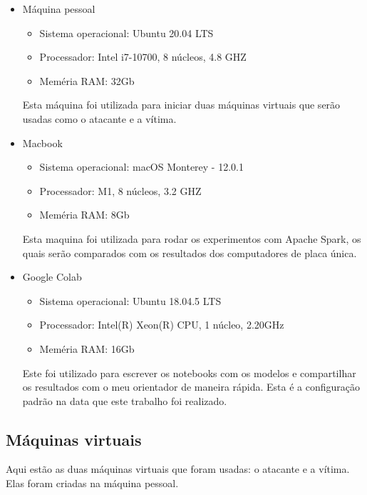\begin{itemize}
    \item Máquina pessoal
        \begin{itemize}
            \item Sistema operacional: Ubuntu 20.04 LTS
            \item Processador: Intel i7-10700, 8 núcleos, 4.8 GHZ
            \item Meméria RAM: 32Gb
        \end{itemize}
        Esta máquina foi utilizada para iniciar duas máquinas virtuais que serão usadas 
        como o atacante e a vítima.
    \item Macbook 
        \begin{itemize}
            \item Sistema operacional: macOS Monterey - 12.0.1
            \item Processador: M1, 8 núcleos, 3.2 GHZ
            \item Meméria RAM: 8Gb
        \end{itemize}        
        Esta maquina foi utilizada para rodar os experimentos com Apache Spark, os quais 
        serão comparados com os resultados dos computadores de placa única.
    \item Google Colab
        \begin{itemize}
            \item Sistema operacional: Ubuntu 18.04.5 LTS
            \item Processador: Intel(R) Xeon(R) CPU, 1 núcleo, 2.20GHz
            \item Meméria RAM: 16Gb
        \end{itemize} 
        Este foi utilizado para escrever os notebooks com os modelos e compartilhar os resultados
        com o meu orientador de maneira rápida. Esta é a configuração padrão na data que este
        trabalho foi realizado.
\end{itemize}


\subsection{Máquinas virtuais}

Aqui estão as duas máquinas virtuais que foram usadas: o atacante e a vítima. 
Elas foram criadas na máquina pessoal.


